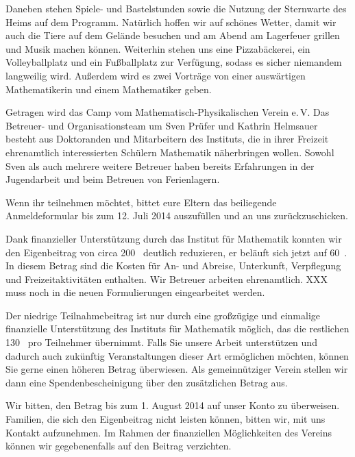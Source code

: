 \documentclass{zettel}
\begin{document}
Daneben stehen Spiele- und Bastelstunden sowie die Nutzung der
Sternwarte des Heims auf dem Programm. Natürlich hoffen wir auf
schönes Wetter, damit wir auch die Tiere auf dem Gelände besuchen
und am Abend am Lagerfeuer grillen und Musik machen können.
Weiterhin stehen uns eine Pizzabäckerei, ein Volleyballplatz und ein
Fußballplatz zur Verfügung, sodass es sicher niemandem langweilig
wird. Außerdem wird es zwei Vorträge von
einer auswärtigen Mathematikerin und einem Mathematiker geben.

Getragen wird das Camp vom Mathematisch-Physikalischen Verein e.\,V.
Das Betreuer- und Organisationsteam um Sven Prüfer und Kathrin Helmsauer
besteht aus Doktoranden und Mitarbeitern des Instituts, die in
ihrer Freizeit ehrenamtlich interessierten Schülern Mathematik näherbringen wollen.
Sowohl Sven als auch mehrere weitere Betreuer haben bereits Erfahrungen in der
Jugendarbeit und beim Betreuen von Ferienlagern.

Wenn ihr teilnehmen möchtet, bittet eure Eltern das beiliegende Anmeldeformular
bis zum 12. Juli 2014 auszufüllen und an uns zurückzuschicken.
\vspace{\medskipamount}

\begin{minipage}{0.54\textwidth}
Dank finanzieller Unterstützung durch das Institut für Mathematik konnten wir
den Eigenbeitrag von circa 200~\texteuro{} deutlich reduzieren, er beläuft sich
jetzt auf 60~\texteuro. In diesem Betrag sind die Kosten für An- und Abreise,
Unterkunft, Verpflegung und Freizeitaktivitäten enthalten. Wir Betreuer
arbeiten ehrenamtlich. XXX muss noch in die neuen Formulierungen eingearbeitet
werden.
\end{minipage}

\newpage

Der niedrige Teilnahmebeitrag ist nur durch eine großzügige und
einmalige finanzielle Unterstützung des Instituts für Mathematik
möglich, das die restlichen 130~\texteuro{} pro Teilnehmer übernimmt.
Falls Sie unsere Arbeit unterstützen und dadurch auch
zukünftig Veranstaltungen dieser Art ermöglichen möchten, können
Sie gerne einen höheren Betrag überwiesen. Als gemeinnütziger
Verein stellen wir dann eine Spendenbescheinigung über den
zusätzlichen Betrag aus.

Wir bitten, den Betrag bis zum 1. August 2014 auf unser Konto zu überweisen.
Familien, die sich den
Eigenbeitrag nicht leisten können, bitten wir, mit uns Kontakt aufzunehmen. Im
Rahmen der finanziellen Möglichkeiten des Vereins können wir gegebenenfalls
auf den Beitrag verzichten.
\end{document}
